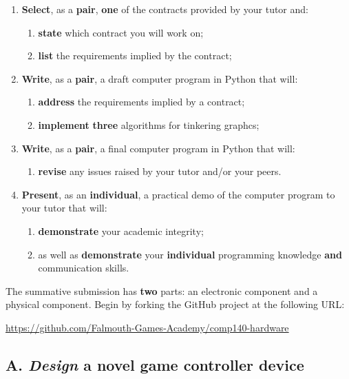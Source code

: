 \documentclass{../fal_assignment}
\begin{document}
\begin{enumerate}[label=(\Alph*)]
    \item \textbf{Select}, as a \textbf{pair}, \textbf{one} of the contracts provided by your tutor and:
    	\begin{enumerate}[label=\roman*.]
    		\item \textbf{state} which contract you will work on;
    		\item \textbf{list} the requirements implied by the contract;
	\end{enumerate}
    \item \textbf{Write}, as a \textbf{pair}, a draft computer program in Python that will:
    	\begin{enumerate}[label=\roman*.]
    		\item \textbf{address} the requirements implied by a contract;
    		\item \textbf{implement} \textbf{three} algorithms for tinkering graphcs;
	\end{enumerate}
    \item \textbf{Write}, as a \textbf{pair}, a final computer program in Python that will:
    	\begin{enumerate}[label=\roman*.]
    		\item \textbf{revise} any issues raised by your tutor and/or your peers.
	\end{enumerate}
    \item \textbf{Present}, as an \textbf{individual}, a practical demo of the computer program to your tutor that will:
    	\begin{enumerate}[label=\roman*.]
    		\item \textbf{demonstrate} your academic integrity;
    		\item as well as \textbf{demonstrate} your \textbf{individual} programming knowledge \textbf{and} communication skills.
	\end{enumerate}
\end{enumerate}

The summative submission has \textbf{two} parts: an electronic component and a physical component.
Begin by forking the GitHub project at the following URL:
\begin{center}
\url{https://github.com/Falmouth-Games-Academy/comp140-hardware}
\end{center}

\subsection*{A. \emph{Design} a novel game controller device}
\end{document}
